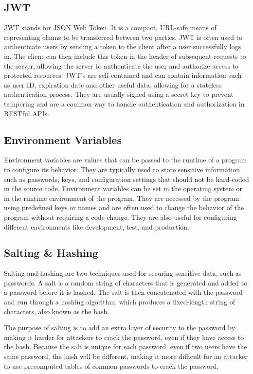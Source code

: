 \documentclass[12pt]{article}
\begin{document}
	\subsection*{JWT}
	JWT stands for JSON Web Token. It is a compact, URL-safe means of representing claims to be transferred between two parties. JWT is often used to authenticate users by sending a token to the client after a user successfully logs in. The client can then include this token in the header of subsequent requests to the server, allowing the server to authenticate the user and authorize access to protected resources. JWT's are self-contained and can contain information such as user ID, expiration date and other useful data, allowing for a stateless authentication process. They are usually signed using a secret key to prevent tampering and are a common way to handle authentication and authorization in RESTful APIs.
	
	\subsection*{Environment Variables}
	Environment variables are values that can be passed to the runtime of a program to configure its behavior. They are typically used to store sensitive information such as passwords, keys, and configuration settings that should not be hard-coded in the source code. Environment variables can be set in the operating system or in the runtime environment of the program. They are accessed by the program using predefined keys or names and are often used to change the behavior of the program without requiring a code change. They are also useful for configuring different environments like development, test, and production.
	
	\subsection*{Salting & Hashing}
	Salting and hashing are two techniques used for securing sensitive data, such as passwords. A salt is a random string of characters that is generated and added to a password before it is hashed. The salt is then concatenated with the password and run through a hashing algorithm, which produces a fixed-length string of characters, also known as the hash.
	
	The purpose of salting is to add an extra layer of security to the password by making it harder for attackers to crack the password, even if they have access to the hash. Because the salt is unique for each password, even if two users have the same password, the hash will be different, making it more difficult for an attacker to use precomputed tables of common passwords to crack the password.
	
\end{document}

